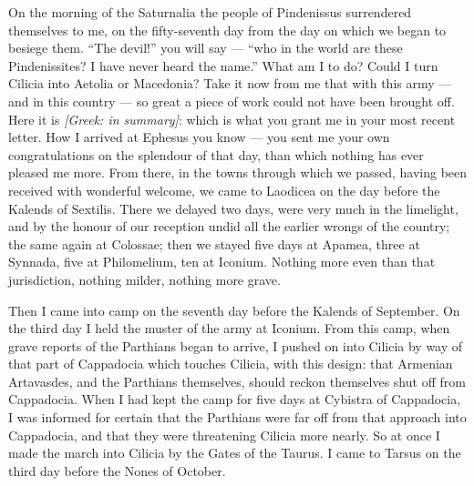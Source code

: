 

 On the morning of the Saturnalia the people of Pindenissus surrendered themselves to me, on the fifty-seventh day from the day on which we began to besiege them. ``The devil!'' you will say --- ``who in the world are these Pindenissites? I have never heard the name.'' What am I to do? Could I turn Cilicia into Aetolia or Macedonia? Take it now from me that with this army --- and in this country --- so great a piece of work could not have been brought off. Here it is \textit{[Greek: in summary]}: which is what you grant me in your most recent letter. How I arrived at Ephesus you know --- you sent me your own congratulations on the splendour of that day, than which nothing has ever pleased me more. From there, in the towns through which we passed, having been received with wonderful welcome, we came to Laodicea on the day before the Kalends of Sextilis. There we delayed two days, were very much in the limelight, and by the honour of our reception undid all the earlier wrongs of the country; the same again at Colossae; then we stayed five days at Apamea, three at Synnada, five at Philomelium, ten at Iconium. Nothing more even than that jurisdiction, nothing milder, nothing more grave.

 Then I came into camp on the seventh day before the Kalends of September. On the third day I held the muster of the army at Iconium. From this camp, when grave reports of the Parthians began to arrive, I pushed on into Cilicia by way of that part of Cappadocia which touches Cilicia, with this design: that Armenian Artavasdes, and the Parthians themselves, should reckon themselves shut off from Cappadocia. When I had kept the camp for five days at Cybistra of Cappadocia, I was informed for certain that the Parthians were far off from that approach into Cappadocia, and that they were threatening Cilicia more nearly. So at once I made the march into Cilicia by the Gates of the Taurus. I came to Tarsus on the third day before the Nones of October.

